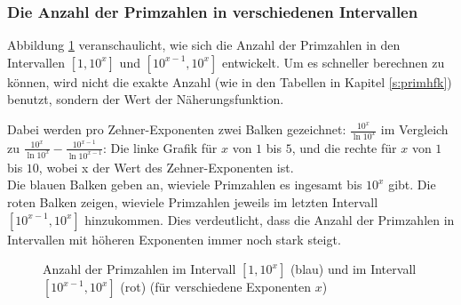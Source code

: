 \begin{refsegment}
\subsubsection*{Die Anzahl der Primzahlen in verschiedenen Intervallen}
\label{primes:_Appendix_subsubsection_NumberofPrimes-in-intervals}
Abbildung \ref{deltazehnxdurchlnxbis}
veranschaulicht, wie sich die Anzahl der Primzahlen in den Intervallen
$[1, 10^x]$ und $[10^{x-1},10^{x}]$ entwickelt. Um es schneller
berechnen zu können, wird
nicht die exakte Anzahl (wie in den Tabellen in Kapitel \ref{s:primhfk})
benutzt, sondern der Wert der Näherungsfunktion.

Dabei werden pro Zehner-Exponenten zwei Balken gezeichnet:
$\frac{10^{x}}{\ln{10^{x}}}$ im Vergleich zu $\frac{10^{x}}{\ln{10^{x}}}-\frac{10^{x-1}}{\ln{10^{x-1}}}$:
Die linke Grafik für $x$ von $1$ bis $5$, und die rechte für $x$ von $1$ bis $10$, wobei x der Wert des Zehner-Exponenten ist.\\

Die blauen Balken geben an, wieviele Primzahlen es ingesamt bis $10^x$ gibt.
Die roten Balken zeigen, wieviele Primzahlen jeweils im letzten Intervall
$[10^{x-1},10^x]$ hinzukommen.
Dies verdeutlicht, dass die Anzahl der Primzahlen in Intervallen mit höheren
Exponenten immer noch stark steigt.

\begin{figure}[!htb]
	\centering
	\hfill
	\caption{Anzahl der Primzahlen im Intervall $[1, 10^x]$ (blau) und im
         Intervall $[10^{x-1},10^x]$ (rot) (für verschiedene Exponenten $x$)}
	\label{deltazehnxdurchlnxbis}
\end{figure}



\end{refsegment}
